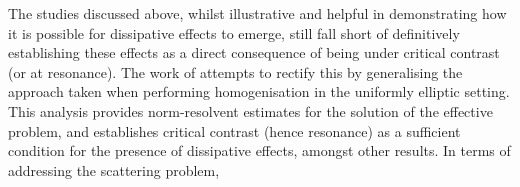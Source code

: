 The studies discussed above, whilst illustrative and helpful in demonstrating how it is possible for dissipative effects to emerge, still fall short of definitively establishing these effects as a direct consequence of being under critical contrast (or at resonance).
The work of  attempts to rectify this by generalising the approach taken when performing homogenisation in the uniformly elliptic setting.
This analysis provides norm-resolvent estimates for the solution of the effective problem, and establishes critical contrast (hence resonance) as a sufficient condition for the presence of dissipative effects, amongst other results.
In terms of addressing the scattering problem, 



